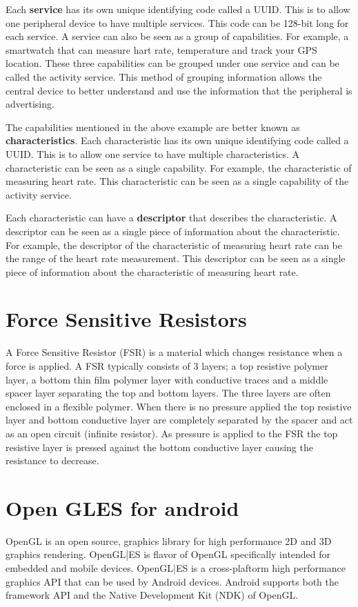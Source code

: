 Each \textbf{service} has its own unique identifying code called a UUID. This is to allow one peripheral device to have multiple services. This code can be 128-bit long for each service. A service can also be seen as a group of capabilities. For example, a smartwatch that can measure hart rate, temperature and track your GPS location. These three capabilities can be grouped under one service and can be called the activity service. This method of grouping information allows the central device to better understand and use the information that the peripheral is advertising.

The capabilities mentioned in the above example are better known as \textbf{characteristics}. Each characteristic has its own unique identifying code called a UUID. This is to allow one service to have multiple characteristics. A characteristic can be seen as a single capability. For example, the characteristic of measuring heart rate. This characteristic can be seen as a single capability of the activity service. 

Each characteristic can have a \textbf{descriptor} that describes the characteristic. A descriptor can be seen as a single piece of information about the characteristic. For example, the descriptor of the characteristic of measuring heart rate can be the range of the heart rate measurement. This descriptor can be seen as a single piece of information about the characteristic of measuring heart rate.


\section{Force Sensitive Resistors}
A Force Sensitive Resistor (FSR) is a material which changes resistance when a force is
applied. A FSR typically consists of 3 layers; a top resistive polymer layer, a bottom thin
film polymer layer with conductive traces and a middle spacer layer separating the top
and bottom layers. The three layers are often enclosed in a flexible polymer.
When there is no pressure applied the top resistive layer and bottom conductive layer
are completely separated by the spacer and act as an open circuit (infinite resistor).
As pressure is applied to the FSR the top resistive layer is pressed against the bottom
conductive layer causing the resistance to decrease.

\section{Open GLES for android}
\label{sec:OpenGL}
OpenGL is an open source, graphics library for high performance 2D and 3D graphics rendering. OpenGL|ES is flavor of OpenGL specifically intended for embedded and mobile devices. OpenGL|ES is a cross-plaftorm high performance graphics API that can be used by Android devices. Android supports both the framework API and the Native Development Kit (NDK) of OpenGL.
